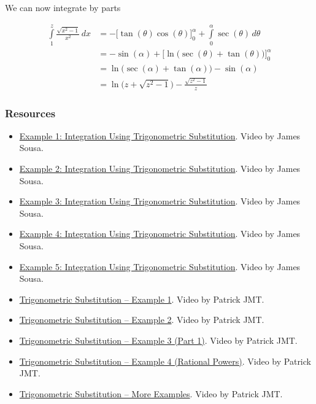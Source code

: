 We can now integrate by parts


\begin{align}
\int\limits_1^z \frac{\sqrt{x^2-1}}{x^2}\,dx 
&= -\bigg[\tan(\theta)\cos(\theta)\bigg] _0^\alpha + \int\limits_0^\alpha \sec(\theta)\,d\theta \\&= -\sin(\alpha) + \bigg[\ln\bigl(\sec(\theta) + \tan(\theta)\bigr)\bigg] _0^\alpha \\&= \ln\bigl(\sec(\alpha) + \tan(\alpha)\bigr) - \sin(\alpha) \\&= \ln\bigl(z + \sqrt{z^2 - 1}\bigr) - \frac{\sqrt{z^2 - 1}}{z}
\end{align}

\subsubsection{Resources}
\label{sss:reso-55b5}

\begin{itemize}

\item \href{https://youtu.be/BVn8x7wCa3A}{Example 1: Integration Using Trigonometric Substitution}.  
Video by James Sousa.

\item \href{https://youtu.be/a-f63vZVuBQ}{Example 2: Integration Using Trigonometric Substitution}.  
Video by James Sousa.

\item \href{https://youtu.be/jZa4FM6l6pM}{Example 3: Integration Using Trigonometric Substitution}.  
Video by James Sousa.

\item \href{https://youtu.be/ObxsrPx44nw}{Example 4: Integration Using Trigonometric Substitution}.  
Video by James Sousa.

\item \href{https://youtu.be/OnT7Ub68FWg}{Example 5: Integration Using Trigonometric Substitution}.  
Video by James Sousa.

\item \href{https://youtu.be/3lC5AuCFK4c}{Trigonometric Substitution – Example 1}.  
Video by Patrick JMT.

\item \href{https://youtu.be/GVL4lHX6DgM}{Trigonometric Substitution – Example 2}.  
Video by Patrick JMT.

\item \href{https://youtu.be/yW6Odu0YHL0}{Trigonometric Substitution – Example 3 (Part 1)}.  
Video by Patrick JMT.

\item \href{https://youtu.be/4QNntd_KZbc}{Trigonometric Substitution – Example 4 (Rational Powers)}.  
Video by Patrick JMT.

\item \href{https://youtu.be/wuRNmNDLanc}{Trigonometric Substitution – More Examples}.  
Video by Patrick JMT.

\end{itemize}

